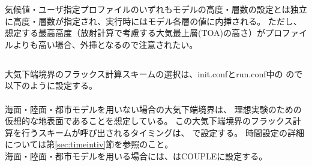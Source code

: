 気候値・ユーザ指定プロファイルのいずれもモデルの高度・層数の設定とは独立に高度・層数が指定され、実行時にはモデル各層の値に内挿される。
ただし、想定する最高高度（放射計算で考慮する大気最上層(TOA)の高さ）がプロファイルよりも高い場合、外挿となるので注意されたい。\\




\subsection{\SubsecSurfaceSetting} \label{subsec:basic_usel_surface}
大気下端境界のフラックス計算スキームの選択は、init.confとrun.conf中の
ので以下のように設定する。\\

\\


海面・陸面・都市モデルを用いない場合の大気下端境界は、
理想実験のための仮想的な地表面であることを想定している。
この大気下端境界のフラックス計算を行うスキームが呼び出されるタイミングは、
で設定する。
時間設定の詳細については第\ref{sec:timeintiv}節を参照のこと。\\

海面・陸面・都市モデルを用いる場合には、はCOUPLEに設定する。


